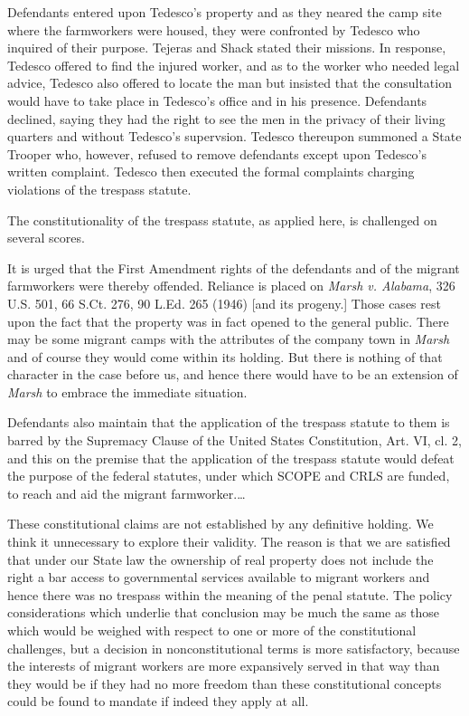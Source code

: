 Defendants entered upon Tedesco's property and as they neared the camp site
where the farmworkers were housed, they were confronted by Tedesco who inquired
of their purpose. Tejeras and Shack stated their missions. In response, Tedesco
offered to find the injured worker, and as to the worker who needed legal
advice, Tedesco also offered to locate the man but insisted that the
consultation would have to take place in Tedesco's office and in his presence.
Defendants declined, saying they had the right to see the men in the privacy of
their living quarters and without Tedesco's supervsion. Tedesco thereupon
summoned a State Trooper who, however, refused to remove defendants except upon
Tedesco's written complaint. Tedesco then executed the formal complaints
charging violations of the trespass statute.


The constitutionality of the trespass statute, as applied here, is challenged on
several scores.

It is urged that the First Amendment rights of the defendants and of the migrant
farmworkers were thereby offended. Reliance is placed on \emph{Marsh v.
Alabama}, 326
U.S. 501, 66 S.Ct. 276, 90 L.Ed. 265 (1946) [and its progeny.] Those cases rest
upon the fact that the property was in fact opened to the general public. There
may be some migrant camps with the attributes of the company town in
\emph{Marsh} and
of course they would come within its holding. But there is nothing of that
character in the case before us, and hence there would have to be an extension
of \emph{Marsh} to embrace the immediate situation.

Defendants also maintain that the application of the trespass statute to them is
barred by the Supremacy Clause of the United States Constitution, Art. VI, cl.
2, and this on the premise that the application of the trespass statute would
defeat the purpose of the federal statutes, under which SCOPE and CRLS are
funded, to reach and aid the migrant farmworker.\ldots

These constitutional claims are not established by any definitive holding. We
think it unnecessary to explore their validity. The reason is that we are
satisfied that under our State law the ownership of real property does not
include the right a bar access to governmental services available to migrant
workers and hence there was no trespass within the meaning of the penal
statute. The policy considerations which underlie that conclusion may be much
the same as those which would be weighed with respect to one or more of the
constitutional challenges, but a decision in nonconstitutional terms is more
satisfactory, because the interests of migrant workers are more expansively
served in that way than they would be if they had no more freedom than these
constitutional concepts could be found to mandate if indeed they apply at all.


